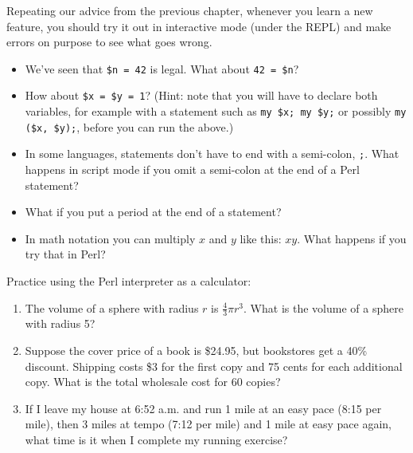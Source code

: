 \begin{exercise}

Repeating our advice from the previous chapter, whenever you learn
a new feature, you should try it out in interactive mode (under 
the REPL) and make errors on purpose to see what goes wrong.

\begin{itemize}

\item We've seen that {\tt \$n = 42} is legal.  What about {\tt 42 = \$n}?

\item How about {\tt \$x = \$y = 1}? (Hint: note that you will 
have to declare both variables, for example with a statement 
such as {\tt my \$x; my \$y;} or possibly {\tt my (\$x, \$y);}, 
before you can run the above.)

\item In some languages, statements don't have to end with a semi-colon, 
{\tt ;}. What happens in script mode if you omit a semi-colon at the end
of a Perl statement?

\item What if you put a period at the end of a statement?

\item In math notation you can multiply $x$ and $y$ like this: $x y$.
What happens if you try that in Perl?

\end{itemize}

\end{exercise}


\begin{exercise}

Practice using the Perl interpreter as a calculator: 

\begin{enumerate}

\item The volume of a sphere with radius $r$ is $\frac{4}{3} \pi r^3$.
  What is the volume of a sphere with radius 5?

\item Suppose the cover price of a book is \$24.95, but bookstores get a
  40\% discount.  Shipping costs \$3 for the first copy and 75 cents
  for each additional copy.  What is the total wholesale cost for
  60 copies?

\item If I leave my house at 6:52 a.m. and run 1 mile at an easy pace
  (8:15 per mile), then 3 miles at tempo (7:12 per mile) and 1 mile at
  easy pace again, what time is it when I complete my running exercise?

\end{enumerate}
\end{exercise}

